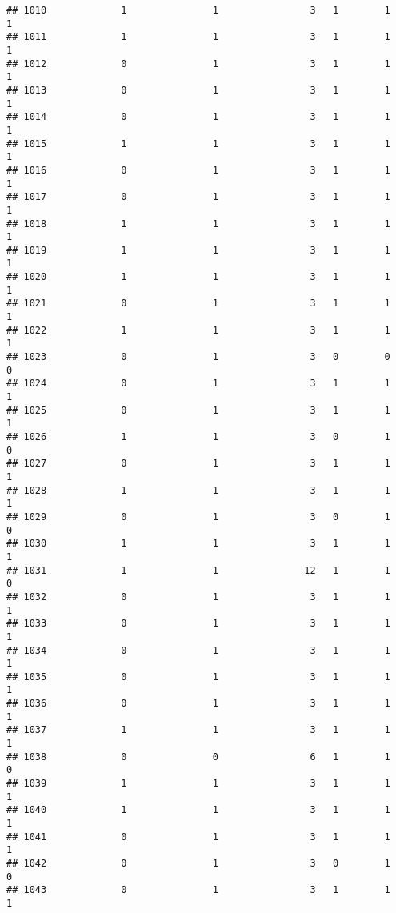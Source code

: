 \documentclass[]{article}
\begin{document}
\begin{verbatim}
## 1010             1               1                3   1        1        1
## 1011             1               1                3   1        1        1
## 1012             0               1                3   1        1        1
## 1013             0               1                3   1        1        1
## 1014             0               1                3   1        1        1
## 1015             1               1                3   1        1        1
## 1016             0               1                3   1        1        1
## 1017             0               1                3   1        1        1
## 1018             1               1                3   1        1        1
## 1019             1               1                3   1        1        1
## 1020             1               1                3   1        1        1
## 1021             0               1                3   1        1        1
## 1022             1               1                3   1        1        1
## 1023             0               1                3   0        0        0
## 1024             0               1                3   1        1        1
## 1025             0               1                3   1        1        1
## 1026             1               1                3   0        1        0
## 1027             0               1                3   1        1        1
## 1028             1               1                3   1        1        1
## 1029             0               1                3   0        1        0
## 1030             1               1                3   1        1        1
## 1031             1               1               12   1        1        0
## 1032             0               1                3   1        1        1
## 1033             0               1                3   1        1        1
## 1034             0               1                3   1        1        1
## 1035             0               1                3   1        1        1
## 1036             0               1                3   1        1        1
## 1037             1               1                3   1        1        1
## 1038             0               0                6   1        1        0
## 1039             1               1                3   1        1        1
## 1040             1               1                3   1        1        1
## 1041             0               1                3   1        1        1
## 1042             0               1                3   0        1        0
## 1043             0               1                3   1        1        1

\end{verbatim}
\end{document}
